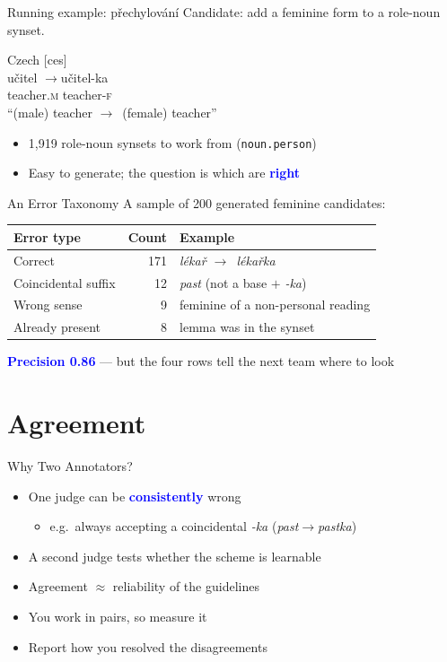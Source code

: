 \documentclass[xetex,aspectratio=169]{beamer}
\newcommand{\gm}[1]{\textsc{\MakeLowercase{#1}}}
\newcommand{\txx}[1]{\textbf{\textcolor{blue}{#1}}}
\newcommand{\into}{\ensuremath{\rightarrow}\xspace}
\begin{document}
\begin{frame}{Running example: p\v{r}echylov\'an\'i}
  Candidate: add a feminine form to a role-noun synset.
  \begin{exe}
    \ex Czech [ces] \\
        \gll u\v{c}itel \quad\into\quad u\v{c}itel-ka \\
             teacher.\gm{m} \qquad teacher-\gm{f} \\
    \trans ``(male) teacher \into\ (female) teacher''
  \end{exe}
  \begin{itemize}
  \item 1{,}919 role-noun synsets to work from (\texttt{noun.person})
  \item Easy to generate; the question is which are \txx{right}
  \end{itemize}
\end{frame}

\begin{frame}{An Error Taxonomy}
  A sample of 200 generated feminine candidates:
  \begin{center}
  \begin{tabular}{lrl}
    \toprule
    Error type & Count & Example \\
    \midrule
    Correct                 & 171 & \textit{l\'eka\v{r} \into\ l\'eka\v{r}ka} \\
    Coincidental suffix     &  12 & \textit{past} (not a base $+$ \textit{-ka}) \\
    Wrong sense             &   9 & feminine of a non-personal reading \\
    Already present         &   8 & lemma was in the synset \\
    \bottomrule
  \end{tabular}
  \end{center}
  \bigskip
  \txx{Precision 0.86} --- but the four rows tell the next team where to look
\end{frame}

\section{Agreement}

\begin{frame}{Why Two Annotators?}
  \begin{itemize}
  \item One judge can be \txx{consistently} wrong
    \begin{itemize}
    \item e.g.\ always accepting a coincidental \textit{-ka} (\textit{past}\into\textit{pastka})
    \end{itemize}
  \item A second judge tests whether the scheme is learnable
  \item Agreement $\approx$ reliability of the guidelines
  \item You work in pairs, so measure it
  \item Report how you resolved the disagreements
  \end{itemize}
\end{frame}
\end{document}

